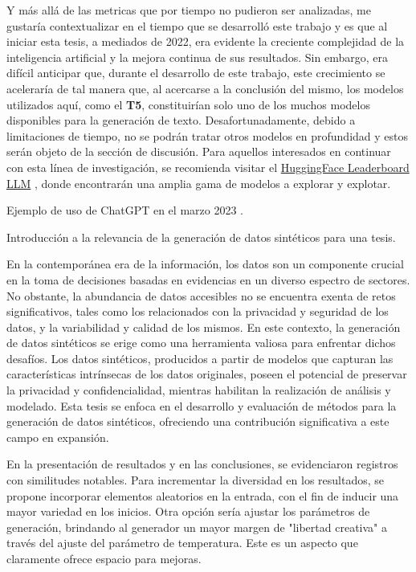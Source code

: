 Y más allá de las metricas que por tiempo no pudieron ser analizadas, me gustaría contextualizar en el tiempo que se desarrolló este trabajo y es que al iniciar esta tesis, a mediados de 2022, era evidente la creciente complejidad de la inteligencia artificial y la mejora continua de sus resultados. Sin embargo, era difícil anticipar que, durante el desarrollo de este trabajo, este crecimiento se aceleraría de tal manera que, al acercarse a la conclusión del mismo, los modelos utilizados aquí, como el \textbf{T5}, constituirían solo uno de los muchos modelos disponibles para la generación de texto. Desafortunadamente, debido a limitaciones de tiempo, no se podrán tratar otros modelos en profundidad y estos serán objeto de la sección de discusión. Para aquellos interesados en continuar con esta línea de investigación, se recomienda visitar el \href{https://huggingface.co/spaces/HuggingFaceH4/open_llm_leaderboard}{HuggingFace Leaderboard LLM} \cite{noauthor_open_nodate}, donde encontrarán una amplia gama de modelos a explorar y explotar.

Ejemplo de uso de ChatGPT en el marzo 2023 \cite{openai_chatgpt_2023}.
\begin{prompt}
    Introducción a la relevancia de la generación de datos sintéticos para una tesis.
\end{prompt}

\begin{chatGPT}
En la contemporánea era de la información, los datos son un componente crucial en la toma de decisiones basadas en evidencias en un diverso espectro de sectores. No obstante, la abundancia de datos accesibles no se encuentra exenta de retos significativos, tales como los relacionados con la privacidad y seguridad de los datos, y la variabilidad y calidad de los mismos. En este contexto, la generación de datos sintéticos se erige como una herramienta valiosa para enfrentar dichos desafíos. Los datos sintéticos, producidos a partir de modelos que capturan las características intrínsecas de los datos originales, poseen el potencial de preservar la privacidad y confidencialidad, mientras habilitan la realización de análisis y modelado. Esta tesis se enfoca en el desarrollo y evaluación de métodos para la generación de datos sintéticos, ofreciendo una contribución significativa a este campo en expansión.
\end{chatGPT}

En la presentación de resultados y en las conclusiones, se evidenciaron registros con similitudes notables. Para incrementar la diversidad en los resultados, se propone incorporar elementos aleatorios en la entrada, con el fin de inducir una mayor variedad en los inicios. Otra opción sería ajustar los parámetros de generación, brindando al generador un mayor margen de "libertad creativa" a través del ajuste del parámetro de temperatura. Este es un aspecto que claramente ofrece espacio para mejoras.

